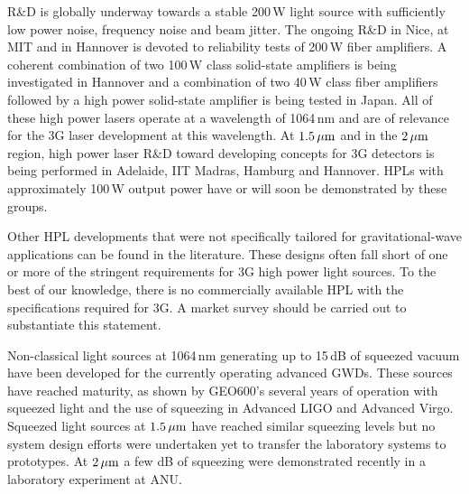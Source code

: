 R\&D is globally underway towards a stable 200\,W light source with sufficiently low power noise, frequency noise and beam jitter. 
The ongoing R\&D in Nice, at MIT and in Hannover is devoted to reliability tests of 200\,W fiber amplifiers. A coherent combination of two 100\,W class solid-state amplifiers is being investigated in Hannover and a combination of two 40\,W class fiber amplifiers followed by a high power solid-state amplifier is being tested in Japan. All of these high power lasers operate at a wavelength of 1064\,nm and are of relevance for the 3G laser development at this wavelength. At $ 1.5\, {\rm \mu m}$ and in the $ 2\, {\rm \mu m}$ region, high power laser R\&D toward developing concepts for 3G detectors is being performed in Adelaide, IIT Madras, Hamburg and Hannover. HPLs with approximately 100\,W output power have or will soon be demonstrated by these groups. 

Other HPL developments that were not specifically tailored for gravitational-wave applications can be found in the literature. These designs often fall short of one or more of the stringent requirements for 3G high power light sources. To the best of our knowledge, there is no commercially available HPL with the specifications required for 3G. A market survey should be carried out to substantiate this statement.

Non-classical light sources at 1064\,nm generating up to 15\,dB of squeezed vacuum have been developed for the currently operating advanced GWDs. These sources have reached maturity, as shown by GEO600's several years of operation with squeezed light and the use of squeezing in Advanced LIGO and Advanced Virgo. Squeezed light sources at $ 1.5\, {\rm \mu m}$ have reached similar squeezing levels but no system design efforts were undertaken yet to transfer the laboratory systems to prototypes. At $ 2\, {\rm \mu m}$ a few dB of squeezing were demonstrated recently in a laboratory experiment at ANU.

